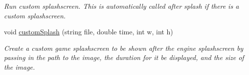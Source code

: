 \begin{DoxyCompactItemize}
\begin{DoxyCompactList}\small\item\em Run custom splashscreen. This is automatically called after splash if there is a custom splashscreen. \end{DoxyCompactList}\item 
void \hyperlink{classEngine_a0960e415d0b9ed92099eee6677d7ea51}{custom\+Splash} (string file, double time, int w, int h)\hypertarget{classEngine_a0960e415d0b9ed92099eee6677d7ea51}{}\label{classEngine_a0960e415d0b9ed92099eee6677d7ea51}

\begin{DoxyCompactList}\small\item\em Create a custom game splashscreen to be shown after the engine splashscreen by passing in the path to the image, the duration for it be displayed, and the size of the image. \end{DoxyCompactList}\end{DoxyCompactItemize}
